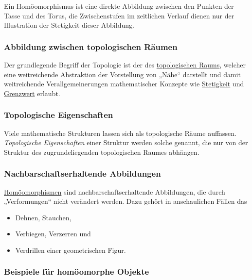 \documentclass[12pt,]{article}
\providecommand{\tightlist}{%
  \setlength{\itemsep}{0pt}\setlength{\parskip}{0pt}}
\begin{document}
Ein Homöomorphismus ist eine direkte Abbildung zwischen den Punkten der
Tasse und des Torus, die Zwischenstufen im zeitlichen Verlauf dienen nur
der Illustration der Stetigkeit dieser Abbildung.

\subsubsection{Abbildung zwischen topologischen
Räumen}\label{abbildung-zwischen-topologischen-ruxe4umen}

Der grundlegende Begriff der Topologie ist der des
\href{Topologischer_Raum}{topologischen Raums}, welcher eine
weitreichende Abstraktion der Vorstellung von „Nähe`` darstellt und
damit weitreichende Verallgemeinerungen mathematischer Konzepte wie
\href{Stetige_Funktion}{Stetigkeit} und
\href{Grenzwert_(Folge)}{Grenzwert} erlaubt.

\subsubsection{Topologische
Eigenschaften}\label{topologische-eigenschaften}

Viele mathematische Strukturen lassen sich als topologische Räume
auffassen. \emph{Topologische Eigenschaften} einer Struktur werden
solche genannt, die nur von der Struktur des zugrundeliegenden
topologischen Raumes abhängen.

\subsubsection{Nachbarschaftserhaltende
Abbildungen}\label{nachbarschaftserhaltende-abbildungen}

\href{Homöomorphismus}{Homöomorphismen} sind nachbarschaftserhaltende
Abbildungen, die durch „Verformungen`` nicht verändert werden. Dazu
gehört in anschaulichen Fällen das

\begin{itemize}
\tightlist
\item
  Dehnen, Stauchen,
\item
  Verbiegen, Verzerren und
\item
  Verdrillen einer geometrischen Figur.
\end{itemize}

\subsubsection{Beispiele für homöomorphe
Objekte}\label{beispiele-fuxfcr-homuxf6omorphe-objekte}
\end{document}
